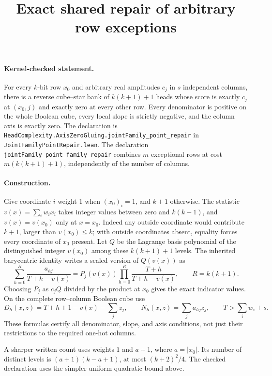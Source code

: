 \documentclass{article}
\begin{document}
\title{Exact shared repair of arbitrary row exceptions}
\maketitle

\paragraph{Kernel-checked statement.}
For every $k$-bit row $x_0$ and arbitrary real amplitudes $c_j$ in $s$
independent columns, there is a reverse cube--star bank of
$k(k+1)+1$ heads whose score is exactly $c_j$ at $(x_0,j)$ and exactly zero
at every other row. Every denominator is positive on the whole Boolean
cube, every local slope is strictly negative, and the column axis is
exactly zero. The declaration is
\texttt{HeadComplexity.AxisZeroGluing.jointFamily\_point\_repair}
in \texttt{JointFamilyPointRepair.lean}.
The declaration \texttt{jointFamily\_point\_family\_repair} combines $m$
exceptional rows at cost $m(k(k+1)+1)$, independently of the number of
columns.

\paragraph{Construction.}
Give coordinate $i$ weight $1$ when $(x_0)_i=1$, and $k+1$ otherwise.
The statistic $v(x)=\sum_i w_i x_i$ takes integer values between zero and
$k(k+1)$, and $v(x)=v(x_0)$ only at $x=x_0$. Indeed any outside coordinate
would contribute $k+1$, larger than $v(x_0)\leq k$; with outside
coordinates absent, equality forces every coordinate of $x_0$ present.
Let $Q$ be the Lagrange basis polynomial of the distinguished integer
$v(x_0)$ among these $k(k+1)+1$ levels. The inherited barycentric identity
writes a scaled version of $Q(v(x))$ as
\[
 \sum_{h=0}^{R}\frac{a_{hj}}{T+h-v(x)}
   = P_j(v(x))\prod_{h=0}^{R}\frac{T+h}{T+h-v(x)},
 \qquad R=k(k+1).
\]
Choosing $P_j$ as $c_j Q$ divided by the product at $x_0$ gives the exact
indicator values. On the complete row--column Boolean cube use
\[
 D_h(x,z)=T+h+1-v(x)-\sum_jz_j,
 \qquad N_h(x,z)=\sum_j a_{hj}z_j,
 \qquad T>\sum_iw_i+s.
\]
These formulas certify all denominator, slope, and axis conditions, not
just their restrictions to the required one-hot columns.

A sharper written count uses weights $1$ and $a+1$, where $a=|x_0|$.
Its number of distinct levels is $(a+1)(k-a+1)$, at most $(k+2)^2/4$.
The checked declaration uses the simpler uniform quadratic bound above.
\end{document}
